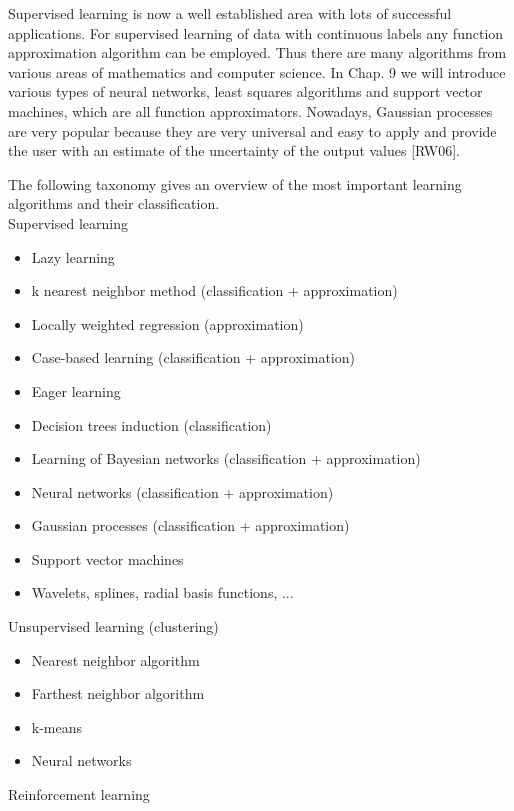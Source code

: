 \documentclass[10pt]{book}
\begin{document}
\begin{center}
\begin{enumerate}
\begin{center}
\begin{center}
\begin{center}
Supervised learning is now a well established area with lots of successful applications. For supervised learning of data with continuous labels any function approximation algorithm can be employed. Thus there are many algorithms from various areas of mathematics and computer science. In Chap. 9 we will introduce various types of neural networks, least squares algorithms and support vector machines, which are all function approximators. Nowadays, Gaussian processes are very popular because they are very universal and easy to apply and provide the user with an estimate of the uncertainty of the output values [RW06].

The following taxonomy gives an overview of the most important learning algorithms and their classification.\\

Supervised learning

\begin{itemize}
  \item Lazy learning
  \item k nearest neighbor method (classification + approximation)
  \item Locally weighted regression (approximation)
  \item Case-based learning (classification + approximation)
  \item Eager learning
  \item Decision trees induction (classification)
  \item Learning of Bayesian networks (classification + approximation)
  \item Neural networks (classification + approximation)
  \item Gaussian processes (classification + approximation)
  \item Support vector machines
  \item Wavelets, splines, radial basis functions, ...
\end{itemize}

Unsupervised learning (clustering)

\begin{itemize}
  \item Nearest neighbor algorithm
  \item Farthest neighbor algorithm
  \item k-means
  \item Neural networks
\end{itemize}

Reinforcement learning


\end{center}
\end{center}
\end{center}
\end{enumerate}
\end{center}
\end{document}
